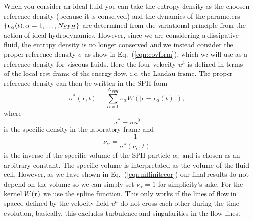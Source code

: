 \documentclass[aps,article]{revtex4}
\begin{document}
When you consider an ideal fluid you can take the entropy density as the choosen reference density (because it is conserved) and the dynamics of the parameters $\{{\bf r}_{\alpha}(t),\alpha=1,\dots,N_{SPH}\}$ are determined from the variational principle from the action of ideal hydrodynamics.  However, since we are considering a dissipative fluid, the entropy density is no longer conserved and we instead consider the proper reference density $\sigma$ as show in Eq.\ (\ref{eqn:covform}), which we will use as a reference density for viscous fluids.  Here the four-velocity $u^{\mu}$ is defined in terms of the local rest frame of the energy flow, i.e. the Landau frame.  The proper reference density can then be written in the SPH form
\begin{equation}\label{eqn:prd}
\sigma ^{\ast }(\mathbf{r},t)=\sum_{\alpha =1}^{N_{SPH}}\nu _{\alpha }W(|%
\mathbf{r}-\mathbf{r}_{\alpha }(t)|),
\end{equation}
where 
\begin{equation}
\sigma ^{\ast }=\sigma u^{0}
\end{equation}
is the specific density in the
laboratory frame and 
\begin{equation}
\nu _{\alpha }=\frac{1}{\sigma ^{\ast }(\mathbf{r}_{\alpha},t)}
\end{equation}
is the inverse of the specific volume
of the SPH particle $\alpha ,$ and is chosen as an arbitrary constant. The specific volume is interpretated as the volume of the fluid cell.  However, as we have shown in Eq.\ (\ref{eqn:mffinitecor}) our final results do not depend on the volume so we can simply set $\nu _{\alpha }=1$ for simplicity's sake. For the kernel $W({\bf r})$ we use the spline function. This only works if the lines of flow in spaced defined by the velocity field $u^{\mu}$ do not cross each other during the time evolution, basically, this excludes turbulence and singularities in the flow lines. 
\end{document}
